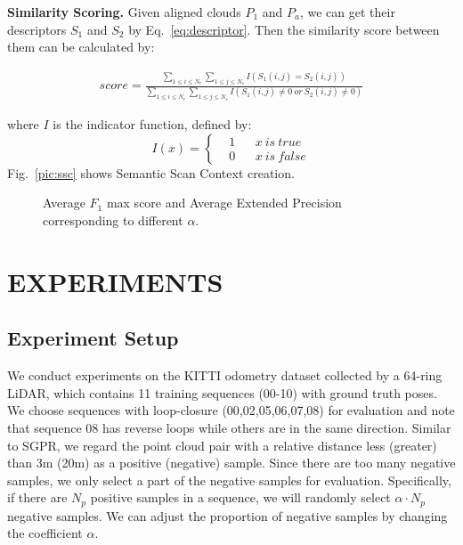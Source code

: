 \documentclass[letterpaper, 10 pt, conference]{ieeeconf}  %
\begin{document}
\smallskip\noindent\textbf{Similarity Scoring.} Given aligned clouds \(P_1\) and \(P_{a}\), we can get their descriptors \(S_1\) and \(S_2\) by Eq.~\ref{eq:descriptor}. Then the similarity score between them can be calculated by:
\begin{small}
\begin{equation}
    \begin{aligned}
        score=\frac{\sum\limits_{ 1\leq i\leq N_r}\sum\limits_{1\leq j\leq N_s} I(S_1(i,j)=S_2(i,j))}{\sum\limits_{1\leq i\leq N_r}\sum\limits_{1\leq j\leq N_s} I(S_1(i,j)\neq 0~or~S_2(i,j)\neq 0)}
    \end{aligned}
\end{equation}
\end{small}
where \(I\) is the indicator function, defined by:
\begin{equation}
    I(x)=\left\{
    \begin{aligned}
        &1& & x~is~true\\
        &0& & x~is~false 
    \end{aligned}
    \right.
\end{equation}
Fig.~\ref{pic:ssc} shows Semantic Scan Context creation. 



    \begin{figure*}[htb]
        \centering
            \vspace{-3mm}
        \caption{Average \(F_1\) max score and Average Extended Precision corresponding to different \(\alpha\).}
        \label{pic:F1}
     \end{figure*}

\section{EXPERIMENTS}


\subsection{Experiment Setup}\label{exp:setup}
We conduct experiments on the KITTI odometry dataset\cite{kitti} collected by a 64-ring LiDAR, which contains 11 training sequences (00-10) with ground truth poses. We choose sequences with loop-closure (00,02,05,06,07,08) for evaluation and note that sequence 08 has reverse loops while others are in the same direction. Similar to SGPR\cite{SGPR}, we regard the point cloud pair with a relative distance less (greater) than 3m (20m) as a positive (negative) sample. Since there are too many negative samples, we only select a part of the negative samples for evaluation. Specifically, if there are \(N_{p}\) positive samples in a sequence, we will randomly select \(\alpha \cdot N_{p}\) negative samples. We can adjust the proportion of negative samples by changing the coefficient \(\alpha\).
\end{document}
